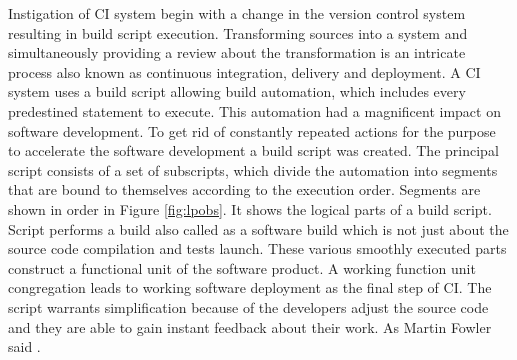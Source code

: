 Instigation of CI system begin with a change in the version control system resulting in build script execution. Transforming sources into a system and simultaneously providing a review about the transformation is an intricate process also known as continuous integration, delivery and deployment. A CI system uses a build script allowing build automation, which includes every predestined statement to execute. This automation had a magnificent impact on software development. To get rid of constantly repeated actions for the purpose to accelerate the software development a build script was created. The principal script consists of a set of subscripts, which divide the automation into segments that are bound to themselves according to the execution order. Segments are shown in order in Figure \ref{fig:lpobs}. It shows the logical parts of a build script. Script performs a build also called as a software build which is not just about the source code compilation and tests launch. These various smoothly executed parts construct a functional unit of the software product. A working function unit congregation leads to working software deployment as the final step of CI. The script warrants simplification because of the developers adjust the source code and they are able to gain instant feedback about their work. As Martin Fowler said  \cite{MartinFowler}.

